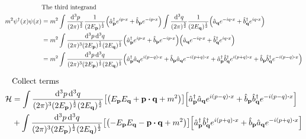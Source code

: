 \documentclass{article}
\begin{document}
\begin{align*}
                            & \qq*{The third integrand}                                                                                                                                                                                                                                                                                                                          \\
  m^2\psi^\dagger(x)\psi(x) & =m^2\int \frac{\dd[3]{p}}{(2\pi)^\frac{3}{2}}  \frac{1}{(2E_{\vb{p}})^{\frac{1}{2}}} \pqty{\hat{a}^\dagger_{\vb{p}}e^{ip\vdot x}+\hat{b}_{\vb{p}}e^{-ip\vdot x}}\int \frac{\dd[3]{q}}{(2\pi)^\frac{3}{2}}  \frac{1}{(2E_{\vb{q}})^{\frac{1}{2}}} \pqty{\hat{a}_{\vb{q}}e^{-iq\vdot x}+\hat{b}^\dagger_{\vb{q}}e^{iq\vdot x}}                       \\
                            & =m^2\int \frac{\dd[3]{p}\dd[3]{q}}{(2\pi)^3(2E_{\vb{p}})^{\frac{1}{2}}(2E_{\vb{q}})^{\frac{1}{2}}}\pqty{\hat{a}^\dagger_{\vb{p}}e^{ip\vdot x}+\hat{b}_{\vb{p}}e^{-ip\vdot x}}\pqty{\hat{a}_{\vb{q}}e^{-iq\vdot x}+\hat{b}^\dagger_{\vb{q}}e^{iq\vdot x}}                                                                                           \\
                            & =m^2\int \frac{\dd[3]{p}\dd[3]{q}}{(2\pi)^3(2E_{\vb{p}})^{\frac{1}{2}}(2E_{\vb{q}})^{\frac{1}{2}}}\pqty{\hat{a}^\dagger_{\vb{p}}\hat{a}_{\vb{q}}e^{i(p-q)\vdot x}+\hat{b}_{\vb{p}}\hat{a}_{\vb{q}}e^{-i(p+q)\vdot x}+\hat{a}^\dagger_{\vb{p}}\hat{b}^\dagger_{\vb{q}}e^{i(p+q)\vdot x}+\hat{b}_{\vb{p}}\hat{b}^\dagger_{\vb{q}}e^{-i(p-q)\vdot x}}
\end{align*}

\begin{align*}
              & \qq*{Collect terms}                                                                                                                                                                                                                                                                 \\
  \mathcal{H} & =\int \frac{\dd[3]{p}\dd[3]{q}}{(2\pi)^3(2E_{\vb{p}})^{\frac{1}{2}}(2E_{\vb{q}})^{\frac{1}{2}}}\bqty{\pqty{E_{\vb{p}}E_{\vb{q}}+\vb{p}\vdot\vb{q}+m^2}}\bqty{\hat{a}^\dagger_{\vb{p}}\hat{a}_{\vb{q}}e^{i(p-q)\vdot x}+\hat{b}_{\vb{p}}\hat{b}^\dagger_{\vb{q}}e^{-i(p-q)\vdot x}}  \\
              & +\int \frac{\dd[3]{p}\dd[3]{q}}{(2\pi)^3(2E_{\vb{p}})^{\frac{1}{2}}(2E_{\vb{q}})^{\frac{1}{2}}}\bqty{\pqty{-E_{\vb{p}}E_{\vb{q}}-\vb{p}\vdot\vb{q}+m^2}}\bqty{\hat{a}^\dagger_{\vb{p}}\hat{b}^\dagger_{\vb{q}}e^{i(p+q)\vdot x}+\hat{b}_{\vb{p}}\hat{a}_{\vb{q}}e^{-i(p+q)\vdot x}} \\
\end{align*}
\end{document}
